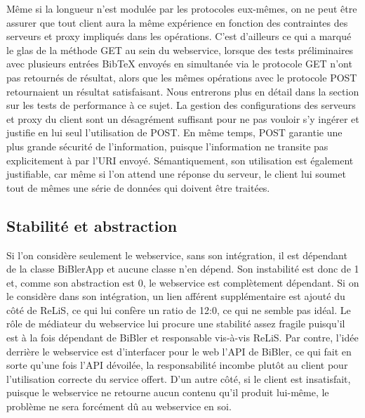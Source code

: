 \documentclass[12pt,titlepage]{article}
\begin{document}
Même si la longueur n'est modulée par les protocoles eux-mêmes, on ne peut être assurer que tout client aura la même expérience en fonction des contraintes des serveurs et proxy impliqués dans les opérations. C'est d'ailleurs ce qui a marqué le glas de la méthode GET au sein du webservice, lorsque des tests préliminaires avec plusieurs entrées BibTeX envoyés en simultanée via le protocole GET n'ont pas retournés de résultat, alors que les mêmes opérations avec le protocole POST retournaient un résultat satisfaisant. Nous entrerons plus en détail dans la section sur les tests de performance à ce sujet. La gestion des configurations des serveurs et proxy du client sont un désagrément suffisant pour ne pas vouloir s'y ingérer et justifie en lui seul l'utilisation de POST. En même temps, POST garantie une plus grande sécurité de l'information, puisque l'information ne transite pas explicitement à par l'URI envoyé. \cite{w3a} Sémantiquement, son utilisation est également justifiable, car même si l'on attend une réponse du serveur, le client lui soumet tout de mêmes une série de données qui doivent être traitées. \newline
\subsection{Stabilité et abstraction}
Si l'on considère seulement le webservice, sans son intégration, il est dépendant de la classe BiBlerApp et aucune classe n'en dépend. Son instabilité est donc de 1 et, comme son abstraction est 0, le webservice est complètement dépendant. Si on le considère dans son intégration, un lien afférent supplémentaire est ajouté du côté de ReLiS, ce qui lui confère un ratio de 1\/2:0, ce qui ne semble pas idéal. Le rôle de médiateur du webservice lui procure une stabilité assez fragile puisqu'il est à la fois dépendant de BiBler et responsable vis-à-vis ReLiS. Par contre, l'idée derrière le webservice est d'interfacer pour le web l'API de BiBler, ce qui fait en sorte qu'une fois l'API dévoilée, la responsabilité incombe plutôt au client pour l'utilisation correcte du service offert. D'un autre côté, si le client est insatisfait, puisque le webservice ne retourne aucun contenu qu'il produit lui-même, le problème ne sera forcément dû au webservice en soi. \newline
\end{document}
